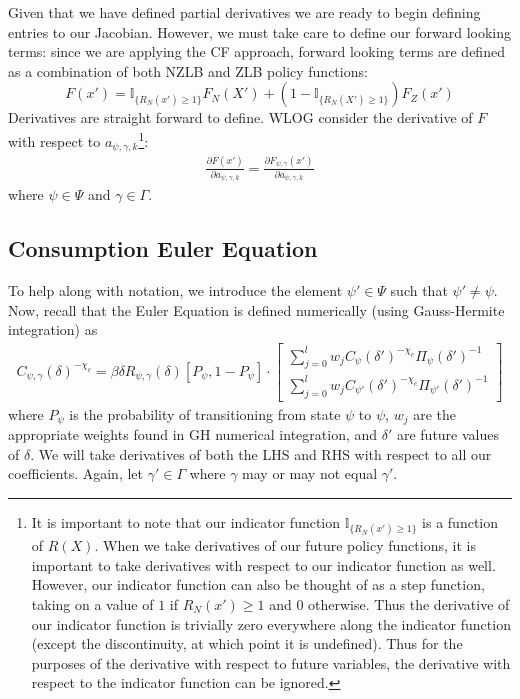 \documentclass[11pt]{article}
\begin{document}
Given that we have defined partial derivatives we are ready to begin defining entries to our Jacobian. However, we must take care to define our forward looking terms: since we are applying the CF approach, forward looking terms are defined as a combination of both NZLB and ZLB policy functions:
\begin{equation}
F(x') = \mathbb{I}_{\{R_N(x')\ge 1\}}F_{N}(X') + (1-\mathbb{I}_{\{R_N(X')\ge 1\}})F_{Z}(x')
\end{equation} 
Derivatives are straight forward to define. WLOG consider the derivative of $F$ with respect to $a_{\psi,\gamma,k}$\footnote{It is important to note that our indicator function $\mathbb{I}_{\{R_N(x')\ge 1\}}$ is a function of $R(X)$. When we take derivatives of our future policy functions, it is important to take derivatives with respect to our indicator function as well. However, our indicator function can also be thought of as a step function, taking on a value of $1$ if $R_N(x')\ge 1$ and $0$ otherwise. Thus the derivative of our indicator function is trivially zero everywhere along the indicator function (except the discontinuity, at which point it is undefined). Thus for the purposes of the derivative with respect to future variables, the derivative with respect to the indicator function can be ignored.}: 
\begin{align}
\frac{\partial F(x')}{\partial a_{\psi,\gamma,k}} = \frac{\partial F_{\psi,\gamma}(x')}{\partial a_{\psi,\gamma,k}}
\end{align}
where $\psi\in\Psi$ and $\gamma\in\Gamma$.

\subsection*{Consumption Euler Equation}
\noindent 
To help along with notation, we introduce the element $\psi'\in\Psi$ such that $\psi'\neq\psi$. Now, recall that the Euler Equation is defined numerically (using Gauss-Hermite integration) as 
\begin{align}
C_{\psi,\gamma}(\delta)^{-\chi_{c}} = \beta\delta R_{\psi,\gamma}(\delta) \left[P_{\psi}, 1-P_{\psi}\right]\cdot
\begin{bmatrix}
\sum_{j = 0}^{l}w_jC_{\psi}(\delta')^{-\chi_{c}}\Pi_{\psi}(\delta')^{-1}\\
\sum_{j = 0}^{l}w_jC_{\psi'}(\delta')^{-\chi_{c}}\Pi_{\psi'}(\delta')^{-1}
\end{bmatrix}
\end{align}
where $P_{\psi}$ is the probability of transitioning from state $\psi$ to $\psi$, $w_j$ are the appropriate weights found in GH numerical integration, and $\delta'$ are future values of $\delta$. We will take derivatives of both the LHS and RHS with respect to all our coefficients. Again, let $\gamma'\in\Gamma$ where $\gamma$ may or may not equal $\gamma'$.
\end{document}
